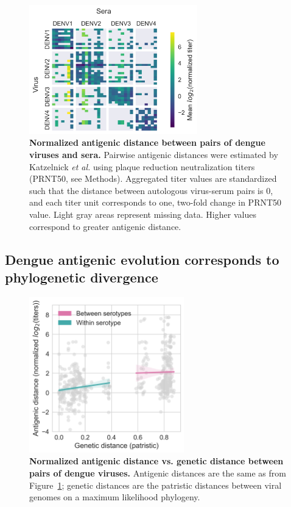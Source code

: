 \documentclass[11pt,oneside,letterpaper]{article}
\begin{document}
\begin{figure}[h]
\begin{centering}
\includegraphics[width=0.65\textwidth]{../figures/png/titer_heatmap.png}
    \caption{\textbf{Normalized antigenic distance between pairs of dengue viruses and sera.}
    Pairwise antigenic distances were estimated by Katzelnick \textit{et al.} using plaque reduction neutralization titers (PRNT50, see Methods).
    Aggregated titer values are standardized such that the distance between autologous virus-serum pairs is 0, and each titer unit corresponds to one, two-fold change in PRNT50 value.
    Light gray areas represent missing data.
    Higher values correspond to greater antigenic distance.
    }
     \label{titer_heatmap}
\end{centering}
\end{figure}

\subsection*{Dengue antigenic evolution corresponds to phylogenetic divergence}

\begin{figure}[h]
  \begin{centering}
  \includegraphics[width=0.6\textwidth]{../figures/png/genetic_antigenic_distance.png}
  	\caption{\textbf{Normalized antigenic distance vs. genetic distance between pairs of dengue viruses.}
    Antigenic distances are the same as from Figure~\ref{titer_heatmap};
    genetic distances are the patristic distances between viral genomes on a maximum likelihood phylogeny.
    }
  	\label{genetic_antigenic_distance}
  \end{centering}
\end{figure}
\end{document}
